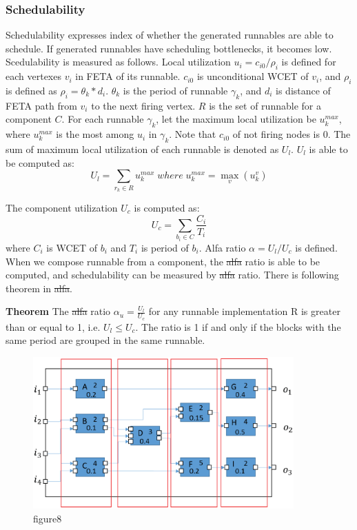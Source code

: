 \documentclass[conference,compsoc]{IEEEtran}
\providecommand{\DIFadd}[1]{{\protect\color{blue}\uwave{#1}}} %
\providecommand{\DIFdel}[1]{{\protect\color{red}\sout{#1}}}                      %
\providecommand{\DIFaddbegin}{} %
\providecommand{\DIFaddend}{} %
\providecommand{\DIFdelbegin}{} %
\providecommand{\DIFdelend}{} %
\begin{document}
\subsubsection{Schedulability}
 Schedulability expresses index of whether the generated runnables are able to schedule.
If generated runnables have scheduling bottlenecks, it becomes low.
Scedulability is measured as follows.
 Local utilization $u_i = c_{i0} / \rho_i$ is defined for each vertexes $v_i$ in  FETA \cite{Lublinerman:2009:MCG:1480881.1480893} of its runnable.
$c_{i0}$ is unconditional WCET of $v_i$, and $\rho_i$ is defined as $\rho_i = \theta_k * d_i$.
$\theta_k$ is the period of runnable  $\gamma_k$, and $d_i$ is distance of FETA path from $v_i$ to the next firing vertex.
$R$ is the set of runnable for a component $C$.
For each runnable $\gamma_k$, let the maximum local utilization  be $u_{k}^{max}$, where $u_k^{max}$ is the most among $u_i$ in $\gamma_k$.  
Note that $c_{i0}$ of not firing nodes is 0.
The sum of maximum local utilization of each runnable is denoted as $U_l$.
$U_l$ is able to be computed as:
\begin{equation}
 U_l = \sum_{r_k \in R} u_{k}^{max}\;where\;u_{k}^{max} = \max_{v}(u_{k}^{v})
\end{equation}

The component utilization $U_c$ is computed as:
\begin{equation}
U_c = \sum_{b_i \in C} \frac{C_i}{T_i}
\end{equation}
where $C_i$ is WCET of $b_i$ and $T_i$ is period of $b_i$.
 Alfa ratio $\alpha = U_l/U_c$ is defined.
When we compose runnable from a component, the \DIFdelbegin \DIFdel{alfa }\DIFdelend \DIFaddbegin \DIFadd{Alfa }\DIFaddend ratio is able to be computed, and schedulability can be measured by \DIFdelbegin \DIFdel{alfa }\DIFdelend \DIFaddbegin \DIFadd{Alfa }\DIFaddend ratio.
There is following theorem in \DIFdelbegin \DIFdel{alfa}\DIFdelend \DIFaddbegin \DIFadd{Alfa}\DIFaddend .

{\bf Theorem} The \DIFdelbegin \DIFdel{alfa }\DIFdelend \DIFaddbegin \DIFadd{Alfa }\DIFaddend ratio $\alpha_u = \frac{U_l}{U_c}$ for any runnable implementation R is greater than or equal to 1, i.e. $U_l \le U_c$.
The ratio is 1 if and only if the blocks with the same period are grouped in the same runnable.

\begin{figure}
	\centering
	\includegraphics[width=10cm,clip]{figure1.eps}
	\caption{figure8}
	\label{fig8}
\end{figure}
\end{document}
